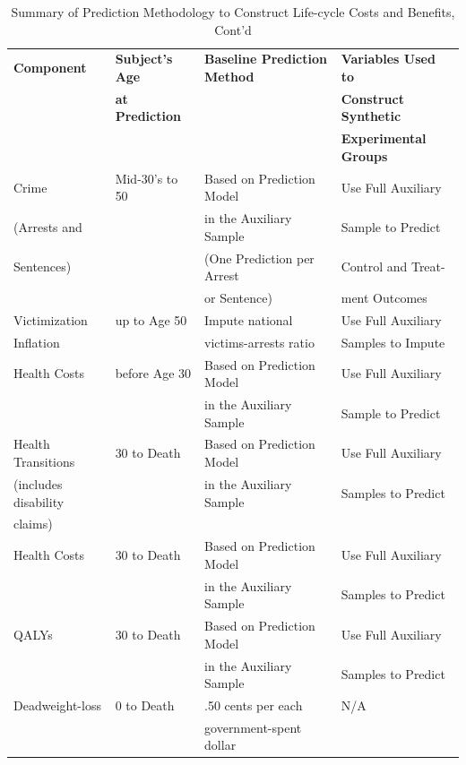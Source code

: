 \documentclass[static]{JJH-Beamer}
\begin{document}
\begin{frame}

\begin{table}[H]
\addtocounter{table}{-1}
\caption{Summary of Prediction Methodology to Construct Life-cycle Costs and Benefits, Cont'd}\label{table:sources}
\begin{center}
\begin{tabular}{llll}
\toprule
\textbf{Component} & \textbf{Subject's Age} & \textbf{Baseline Prediction Method} & \textbf{Variables Used to} \\
&   \textbf{at Prediction} &     & \textbf{Construct Synthetic} \\
&   &   & \textbf{Experimental Groups}\\
\midrule
Crime        & Mid-30's to 50  & Based on Prediction Model   & Use Full Auxiliary   \\
(Arrests and &      & in the Auxiliary Sample  & Sample  to Predict  \\
 Sentences)  &      & (One Prediction per Arrest  & Control and Treat- \\
             &      & or Sentence)   & ment Outcomes \\
\midrule
Victimization  & up to Age 50  &  Impute national   & Use Full Auxiliary \\
Inflation      &   &  victims-arrests ratio   & Samples to Impute   \\
\midrule
Health Costs  & before Age 30 & Based on Prediction Model & Use Full Auxiliary   \\
            &    & in the Auxiliary Sample  & Sample  to Predict  \\
\midrule
Health Transitions   & 30 to Death & Based on Prediction Model & Use Full Auxiliary    \\
(includes disability   &    & in the Auxiliary Sample  & Samples to Predict \\
claims)    &    &    &   \\
\midrule
Health Costs  & 30 to Death  & Based on Prediction Model & Use Full Auxiliary  \\
              &   & in the Auxiliary Sample  & Samples to Predict \\
\midrule
QALYs    & 30 to Death  & Based on Prediction Model & Use Full Auxiliary  \\
         &   & in the Auxiliary Sample  & Samples to Predict \\
\midrule
Deadweight-loss   & 0 to Death   &  .50 cents per each  &  N/A \\
           &   & government-spent dollar  & \\
\bottomrule
\end{tabular}
\end{center}
\end{table}

\end{frame}
\end{document}

